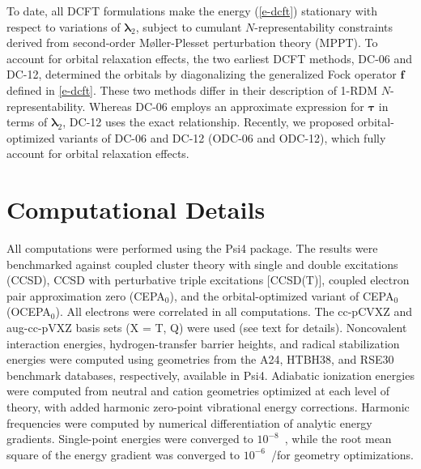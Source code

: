To date, all DCFT formulations make the energy (\ref{e-dcft}) stationary with
respect to variations of $\boldsymbol{\lambda}_2$, subject to cumulant
$N$-representability constraints derived from second-order M\o ller-Plesset
perturbation theory (MPPT).\cite{Kutzelnigg:2004p7350}
To account for orbital relaxation effects, the two earliest DCFT methods,
DC-06\cite{Kutzelnigg:2006p171101,Simmonett:2010p174122,Sokolov:2012p054105} and
DC-12\cite{Sokolov:2013p024107}, determined the orbitals by diagonalizing the
generalized Fock operator $\boldsymbol{f}$ defined in \cref{e-dcft}.
These two methods differ in their description of 1-RDM $N$-representability.
Whereas DC-06 employs an approximate expression for $\boldsymbol{\tau}$ in terms
of $\boldsymbol{\lambda}_2$, DC-12 uses the exact relationship.
Recently, we proposed orbital-optimized variants of DC-06 and DC-12 (ODC-06 and
ODC-12),\cite{Sokolov:2013p204110} which fully account for orbital relaxation
effects.


\section{Computational Details}


All computations were performed using the Psi4
package.\cite{Turney:2012p556}
The results were benchmarked against coupled cluster theory with single and
double excitations (CCSD)\cite{Crawford:2000p33,Bartlett:2007p291,Shavitt:2009},
CCSD with perturbative triple excitations
[CCSD(T)],\cite{Raghavachari:1989p479,Stanton:1997p130} coupled electron pair
approximation zero (CEPA$_0$),\cite{Meyer:1973p1017,Koch:1981p387} and the
orbital-optimized variant of CEPA$_0$ (OCEPA$_0$)\cite{Bozkaya:2013p054104}.
All electrons were correlated in all computations.
The cc-pCVXZ\cite{Dunning:1989p1007,Woon:1995p4572} and
aug-cc-pVXZ\cite{Kendall:1992p6796} basis sets (X = T, Q) were used (see text
for details).
Noncovalent interaction energies, hydrogen-transfer barrier heights, and radical
stabilization energies were computed using geometries from the
A24\cite{Rezac:2013p2151}, HTBH38\cite{Zhao:2005p43}, and
RSE30\cite{Soydas:2013p1452} benchmark databases, respectively, available in
Psi4.
Adiabatic ionization energies were computed from neutral and cation geometries
optimized at each level of theory, with added harmonic zero-point vibrational
energy corrections.
Harmonic frequencies were computed by numerical differentiation of analytic
energy gradients.
Single-point energies were converged to $10^{-8}$~\hartree, while the root mean
square of the energy gradient was converged to $10^{-6}$~\hartree/\bohr for
geometry optimizations. 


